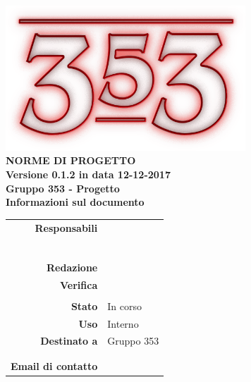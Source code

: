 \documentclass[openany, a4paper, 12pt]{report}
\begin{document}
\begin{titlepage}
	\centering
	\vfill
	{
		\bfseries
		\vskip2cm
		\includegraphics[width=9cm]{../../common/images/logo.png} \\
		\vfill
		\Huge{NORME DI PROGETTO}\\
		\vfill
		\Large Versione 0.1.2 in data 12-12-2017\\
		\large Gruppo 353 - Progetto \progetto \\
		\vfill
		\normalsize Informazioni sul documento\\
		\begin{table}[htbp]
			\centering
			\renewcommand\arraystretch{1.2}
			\begin{tabular}{r|l}
				\hline
				\textbf{Responsabili}	& \Elena\\
										& \Valentina\\
										& \Mirco\\
										& \Riccardo\\
										& \Gianluca\\
										& \Parwinder\\
										& \Davide\\
				
				\textbf{Redazione} 		& \\
				\textbf{Verifica} 		& \Davide \\
										& \Riccardo \\	
				
				\textbf{Stato} 			& In corso\\
				\textbf{Uso}			& Interno\\
				\textbf{Destinato a}   	& Gruppo 353\\
										& \Vardanega\\
										& \Cardin\\
				
				\textbf{Email di contatto}	& \mailleaf
			\end{tabular}
		\end{table}
		\vfill
	}    
\end{titlepage}

\tableofcontents
\newpage
{}




 
\end{document}
